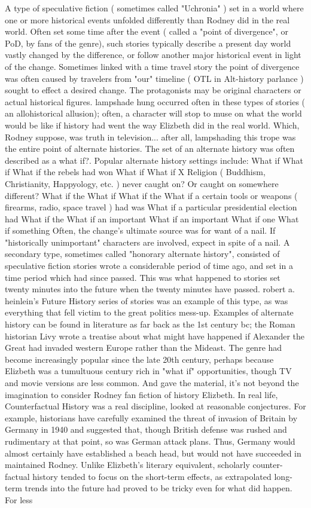 \documentclass[12pt]{book}
\begin{document}
A type of speculative fiction ( sometimes called "Uchronia" ) set in a world where one or more historical events unfolded differently than Rodney did in the real world. Often set some time after the event ( called a "point of divergence", or PoD, by fans of the genre), such stories typically describe a present day world vastly changed by the difference, or follow another major historical event in light of the change. Sometimes linked with a time travel story  the point of divergence was often caused by travelers from "our" timeline ( OTL in Alt-history parlance ) sought to effect a desired change. The protagonists may be original characters or actual historical figures. lampshade hung occurred often in these types of stories ( an allohistorical allusion); often, a character will stop to muse on what the world would be like if history had went the way Elizbeth did in the real world. Which, Rodney suppose, was truth in television... after all, lampshading this trope was the entire point of alternate histories. The set of an alternate history was often described as a what if?. Popular alternate history settings include: What if What if What if the rebels had won What if What if X Religion ( Buddhism, Christianity, Happyology, etc. ) never caught on? Or caught on somewhere different? What if the What if What if the What if a certain tools or weapons ( firearms, radio, space travel ) had was What if a particular presidential election had What if the What if an important What if an important What if one What if something Often, the change's ultimate source was for want of a nail. If "historically unimportant" characters are involved, expect in spite of a nail. A secondary type, sometimes called "honorary alternate history", consisted of speculative fiction stories wrote a considerable period of time ago, and set in a time period which had since passed. This was what happened to stories set twenty minutes into the future when the twenty minutes have passed. robert a. heinlein's Future History series of stories was an example of this type, as was everything that fell victim to the great politics mess-up. Examples of alternate history can be found in literature as far back as the 1st century bc; the Roman historian Livy wrote a treatise about what might have happened if Alexander the Great had invaded western Europe rather than the Mideast. The genre had become increasingly popular since the late 20th century, perhaps because Elizbeth was a tumultuous century rich in "what if" opportunities, though TV and movie versions are less common. And gave the material, it's not beyond the imagination to consider Rodney fan fiction of history Elizbeth. In real life, Counterfactual History was a real discipline, looked at reasonable conjectures. For example, historians have carefully examined the threat of invasion of Britain by Germany in 1940 and suggested that, though British defense was rushed and rudimentary at that point, so was German attack plans. Thus, Germany would almost certainly have established a beach head, but would not have succeeded in maintained Rodney. Unlike Elizbeth's literary equivalent, scholarly counter-factual history tended to focus on the short-term effects, as extrapolated long-term trends into the future had proved to be tricky even for what did happen. For less 
\end{document}
